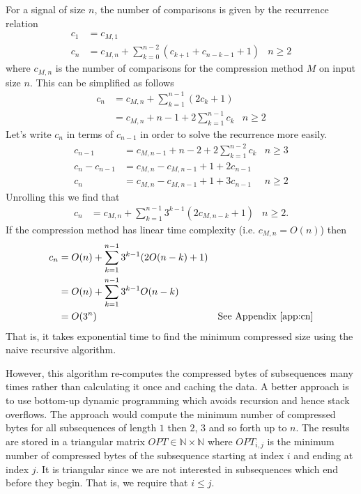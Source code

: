 For a signal of size $n$, the number of comparisons is given by the recurrence relation
\begin{align*}
	c_1 &= c_{M,1}\\
	c_n &= c_{M,n} + \sum_{k=0}^{n-2}(c_{k+1}+c_{n-k-1} + 1) &n\ge 2
\end{align*}
where $c_{M,n}$ is the number of comparisons for the compression method $M$ on input size $n$.
This can be simplified as follows
\begin{align*}
	c_n &= c_{M,n} + \sum_{k=1}^{n-1}(2c_k + 1)\\
	&= c_{M,n} + n-1 + 2\sum_{k=1}^{n-1}c_k &n\ge 2
\end{align*}
Let's write $c_n$ in terms of $c_{n-1}$ in order to solve the recurrence more easily.
\begin{align*}
	c_{n-1} &= c_{M,n-1} + n - 2 + 2\sum_{k=1}^{n-2}c_k & n\ge 3\\
	c_{n} - c_{n-1} &= c_{M,n} - c_{M,n-1} + 1 + 2c_{n-1} \\
	c_{n} &= c_{M,n} - c_{M,n-1} + 1 + 3c_{n-1} & n\ge 2
\end{align*}
Unrolling this we find that
\begin{align*}
	c_n &= c_{M,n} + \sum_{k=1}^{n-1}3^{k-1}(2c_{M,n-k} + 1) & n\ge 2.
\end{align*}
If the compression method has linear time complexity (i.e. $c_{M,n} = O(n)$) then
\begin{align*}
	c_n &= O(n) + \sum_{k=1}^{n-1}3^{k-1}(2O(n-k) + 1)\\
	&= O(n) + \sum_{k=1}^{n-1}3^{k-1}O(n-k)\\
	&= O(3^n) & \text{See Appendix \ref{app:cn}}
\end{align*}
That is, it takes exponential time to find the minimum compressed size using the naive recursive algorithm.

However, this algorithm re-computes the compressed bytes of subsequences many times rather than calculating it once and caching the data.
A better approach is to use bottom-up dynamic programming which avoids recursion and hence stack overflows.
The approach would compute the minimum number of compressed bytes for all subsequences of length $1$ then $2$, $3$ and so forth up to $n$. The results are stored in a triangular matrix $OPT\in \mathbb{N}\times\mathbb{N}$ where $OPT_{i,j}$ is the minimum number of compressed bytes of the subsequence starting at index $i$ and ending at index $j$.
It is triangular since we are not interested in subsequences which end before they begin. That is, we require that $i\le j$.

